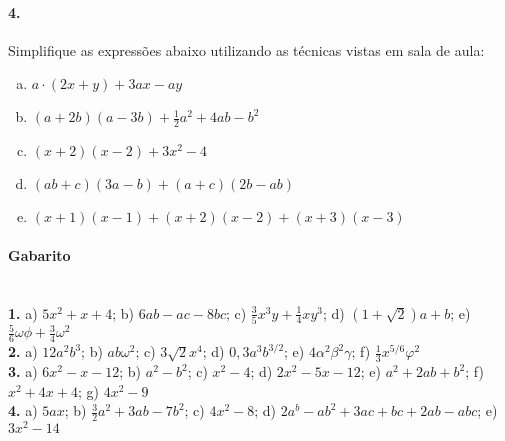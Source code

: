 \documentclass[a4paper,twocolumn,12pt]{article}
\begin{document}
\paragraph*{4.} Simplifique as expressões abaixo utilizando as técnicas vistas em sala de aula:
\begin{enumerate}[a)]
\item $a\cdot(2x + y) + 3ax - ay$
\item $(a+2b)(a-3b) + \frac{1}{2}a^2 +4ab -b^2$
\item $(x+2)(x-2) + 3x^2 - 4$
\item $(ab +c)(3a - b) + (a + c)(2b - ab)$
\item $(x+1)(x-1) + (x+2)(x-2) + (x+3)(x-3)$
\end{enumerate}

\vspace*{\fill}

{\footnotesize
\paragraph*{Gabarito} \hspace*{\fill}\\
\textbf{1.} a) $5x^2 + x + 4$; b) $6ab - ac - 8bc$; c) $\frac{3}{5}x^3y + \frac{1}{4}xy^3$; d) $(1 + \sqrt{2})a + b$; e) $\frac{5}{6}\omega\phi +\frac{3}{4}\omega^2 $\\
\textbf{2.} a) $12a^2b^3$; b) $ab\omega^2$; c) $3\sqrt{2}x^4$; d) $0,\!3a^3b^{3/2}$; e) $4\alpha^2\beta^2\gamma$; f) $\frac{1}{3}x^{5/6}\varphi^2$\\
\textbf{3.} a) $6x^2 - x - 12$; b) $a^2 - b^2$; c) $x^2 - 4$; d) $2x^2 - 5x - 12$; e) $a^2 + 2ab + b^2$; f) $x^2 + 4x + 4$; g) $4x^2 - 9$\\
\textbf{4.} a) $5ax $; b) $\frac{3}{2}a^2 +3ab - 7b^2$; c) $4x^2 - 8$; d) $2a^b - ab^2 + 3ac + bc + 2ab - abc$; e) $3x^2 - 14$
}
\end{document}
